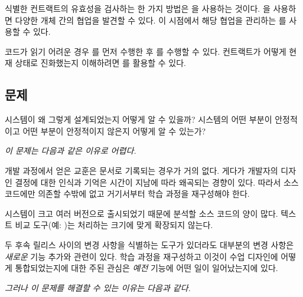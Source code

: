 \documentclass[a4paper,10pt,twoside]{book}
\begin{document}
식별한 컨트랙트의 유효성을 검사하는 한 가지 방법은 을 사용하는 것이다. 을 사용하면 다양한 개체 간의 협업을 발견할 수 있다. 이 시점에서 해당 협업을 관리하는 를 사용할 수 있다.

코드가 읽기 어려운 경우 를 먼저 수행한 후 를 수행할 수 있다. 컨트랙트가 어떻게 현재 상태로 진화했는지 이해하려면 를 활용할 수 있다.



\subsection*{문제}

시스템이 왜 그렇게 설계되었는지 어떻게 알 수 있을까? 시스템의 어떤 부분이 안정적이고 어떤 부분이 안정적이지 않은지 어떻게 알 수 있는가?

\emph{이 문제는 다음과 같은 이유로 어렵다.}

\begin{bulletlist}
\item 개발 과정에서 얻은 교훈은 문서로 기록되는 경우가 거의 없다. 게다가 개발자의 디자인 결정에 대한 인식과 기억은 시간이 지남에 따라 왜곡되는 경향이 있다. 따라서 소스 코드에만 의존할 수밖에 없고 거기서부터 학습 과정을 재구성해야 한다.

\item 시스템이 크고 여러 버전으로 출시되었기 때문에 분석할 소스 코드의 양이 많다. 텍스트 비교 도구(예:  )는 처리하는 크기에 맞게 확장되지 않는다.

\item 두 후속 릴리스 사이의 변경 사항을 식별하는 도구가 있더라도 대부분의 변경 사항은 \emph{새로운} 기능 추가와 관련이 있다. 학습 과정을 재구성하고 이것이 수업 디자인에 어떻게 통합되었는지에 대한 주된 관심은 \emph{예전} 기능에 어떤 일이 일어났는지에 있다.
\end{bulletlist}

\emph{그러나 이 문제를 해결할 수 있는 이유는 다음과 같다.}
\end{document}
